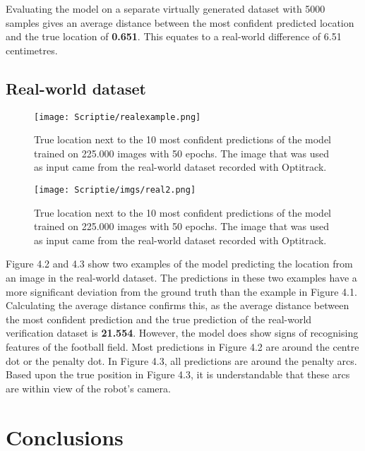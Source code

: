 \documentclass{uva-inf-bachelor-thesis}
\begin{document}
    Evaluating the model on a separate virtually generated dataset with 5000 samples gives an average distance between the most confident predicted location and the true location of \textbf{0.651}. This equates to a real-world difference of 6.51 centimetres. 

    \section{Real-world dataset}
        \begin{figure}[H]
        \centering
        \texttt{[image: Scriptie/realexample.png]}
        \caption{True location next to the 10 most confident predictions of the model trained on 225.000 images with 50 epochs. The image that was used as input came from the real-world dataset recorded with Optitrack.}
        \end{figure}

        \begin{figure}[H]
        \centering
        \texttt{[image: Scriptie/imgs/real2.png]}
        \caption{True location next to the 10 most confident predictions of the model trained on 225.000 images with 50 epochs. The image that was used as input came from the real-world dataset recorded with Optitrack.}
        \end{figure}

        Figure 4.2 and 4.3 show two examples of the model predicting the location from an image in the real-world dataset. The predictions in these two examples have a more significant deviation from the ground truth than the example in Figure 4.1. Calculating the average distance confirms this, as the average distance between the most confident prediction and the true prediction of the real-world verification dataset is \textbf{21.554}. However, the model does show signs of recognising features of the football field. Most predictions in Figure 4.2 are around the centre dot or the penalty dot. In Figure 4.3, all predictions are around the penalty arcs. Based upon the true position in Figure 4.3, it is understandable that these arcs are within view of the robot's camera. 

\chapter{Conclusions}
\end{document}
